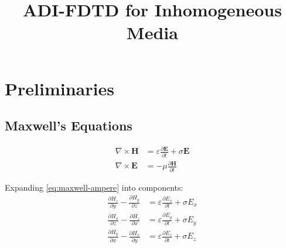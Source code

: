 \documentclass{article}
\title{ADI-FDTD for Inhomogeneous Media}
\numberwithin{equation}{section}
\numberwithin{figure}{section}
\begin{document}
\maketitle

\section{Preliminaries}

\subsection{Maxwell's Equations}
\begin{subequations}\label{eq:maxwell}
    \begin{align}
        \nabla \times \mathbf{H} & = \varepsilon \frac{\partial \mathbf{E}}{\partial t} + \sigma \mathbf{E}
        \label{eq:maxwell-ampere}                                                                           \\
        \nabla \times \mathbf{E} & = -\mu \frac{\partial \mathbf{H}}{\partial t}
        \label{eq:maxwell-faraday}
    \end{align}
\end{subequations}

Expanding \eqref{eq:maxwell-ampere} into components:
\begin{subequations}\label{eq:e-components}
    \begin{align}
        \frac{\partial H_z}{\partial y} - \frac{\partial H_y}{\partial z} & = \varepsilon \frac{\partial E_x}{\partial t} + \sigma E_x
        \label{eq:e-x-component}                                                                                                       \\
        \frac{\partial H_x}{\partial z} - \frac{\partial H_z}{\partial x} & = \varepsilon \frac{\partial E_y}{\partial t} + \sigma E_y
        \label{eq:e-y-component}                                                                                                       \\
        \frac{\partial H_y}{\partial x} - \frac{\partial H_x}{\partial y} & = \varepsilon \frac{\partial E_z}{\partial t} + \sigma E_z
        \label{eq:e-z-component}
    \end{align}
\end{subequations}
\end{document}
